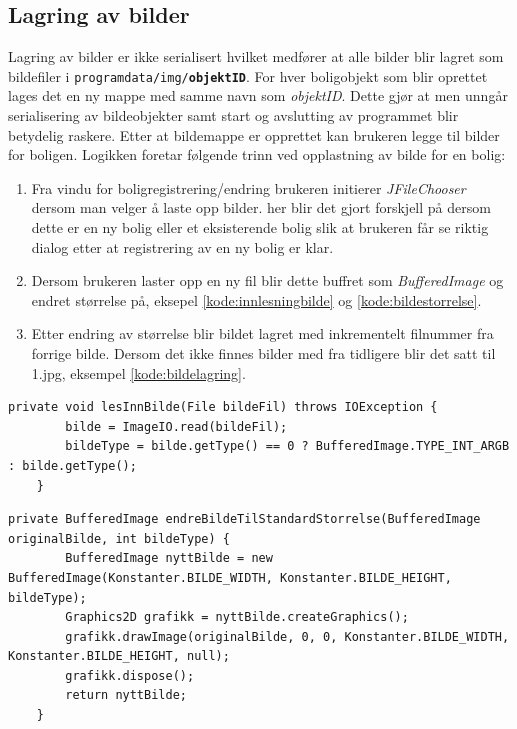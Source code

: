 \subsection{Lagring av bilder}
Lagring av bilder er ikke serialisert hvilket medfører at alle bilder blir lagret som bildefiler i \texttt{programdata/img/\textbf{objektID}}. For hver boligobjekt som blir oprettet lages det en ny mappe med samme navn som \emph{objektID}. Dette gjør at men unngår serialisering av bildeobjekter samt start og avslutting av programmet blir betydelig raskere. Etter at bildemappe er opprettet kan brukeren legge til bilder for boligen. Logikken foretar følgende trinn ved opplastning av bilde for en bolig:
\begin{enumerate}

\item Fra vindu for boligregistrering/endring brukeren initierer \emph{JFileChooser} dersom man velger å laste opp bilder. her blir det gjort forskjell på dersom dette er en ny bolig eller et eksisterende bolig slik at brukeren får se riktig dialog etter at registrering av en ny bolig er klar.

\item Dersom brukeren laster opp en ny fil blir dette buffret som \emph{BufferedImage} og endret størrelse på, eksepel \ref{kode:innlesningbilde} og \ref{kode:bildestorrelse}.

\item Etter endring av størrelse blir bildet lagret med inkrementelt filnummer fra forrige bilde. Dersom det ikke finnes bilder med fra tidligere blir det satt til 1.jpg, eksempel \ref{kode:bildelagring}.

\end{enumerate}

\begin{lstlisting}[caption=BoligBilde.java: Innlesning av bildefil, label=kode:innlesningbilde]
	private void lesInnBilde(File bildeFil) throws IOException {
        bilde = ImageIO.read(bildeFil);
        bildeType = bilde.getType() == 0 ? BufferedImage.TYPE_INT_ARGB : bilde.getType();
    }
\end{lstlisting}

\begin{lstlisting}[caption=BoligBilde.java: Endring av opplastet bildestørrelse, label=kode:bildestorrelse]
	private BufferedImage endreBildeTilStandardStorrelse(BufferedImage originalBilde, int bildeType) {
        BufferedImage nyttBilde = new BufferedImage(Konstanter.BILDE_WIDTH, Konstanter.BILDE_HEIGHT, bildeType);
        Graphics2D grafikk = nyttBilde.createGraphics();
        grafikk.drawImage(originalBilde, 0, 0, Konstanter.BILDE_WIDTH, Konstanter.BILDE_HEIGHT, null);
        grafikk.dispose();
        return nyttBilde;
    }
\end{lstlisting}

